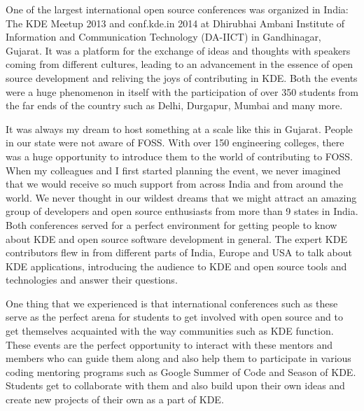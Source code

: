 
\noindent{}One of the largest international open source conferences was organized in India: The KDE Meetup 2013 and conf.kde.in 2014 at Dhirubhai Ambani Institute of Information and Communication Technology (DA-IICT) in Gandhinagar, Gujarat. It was a platform for the exchange of ideas and thoughts with speakers coming from different cultures, leading to an advancement in the essence of open source development and reliving the joys of contributing in KDE. Both the events were a huge phenomenon in itself with the participation of over 350 students from the far ends of the country such as Delhi, Durgapur, Mumbai and many more. 

It was always my dream to host something at a scale like this in Gujarat. People in our state were not aware of FOSS. With over 150 engineering colleges, there was a huge opportunity to introduce them to the world of contributing to FOSS. When my colleagues and I first started planning the event, we never imagined that we would receive so much support from across India and from around the world. We never thought in our wildest dreams that we might attract an amazing group of developers and open source enthusiasts from more than 9 states in India. Both conferences served for a perfect environment for getting people to know about KDE and open source software development in general. The expert KDE contributors flew in from different parts of India, Europe and USA to talk about KDE applications, introducing the audience to KDE and open source tools and technologies and answer their questions.

One thing that we experienced is that international conferences such as these serve as the perfect arena for students to get involved with open source and to get themselves acquainted with the way communities such as KDE function. These events are the perfect opportunity to interact with these mentors and members who can guide them along and also help them to participate in various coding mentoring programs such as Google Summer of Code and Season of KDE. Students get to collaborate with them and also build upon their own ideas and create new projects of their own as a part of KDE.

